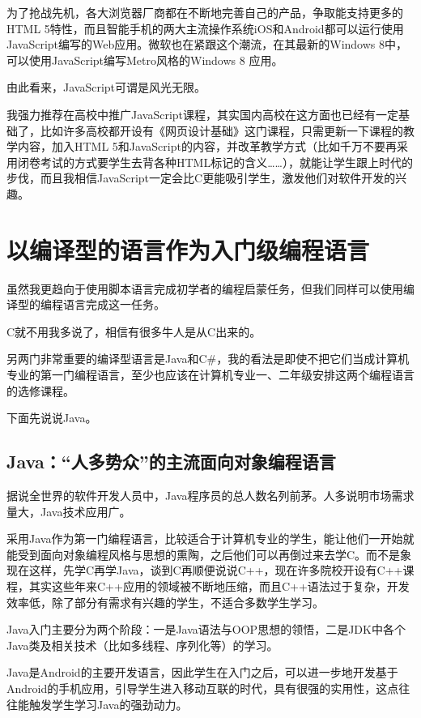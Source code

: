 为了抢战先机，各大浏览器厂商都在不断地完善自己的产品，争取能支持更多的HTML 5特性，而且智能手机的两大主流操作系统iOS和Android都可以运行使用JavaScript编写的Web应用。微软也在紧跟这个潮流，在其最新的Windows 8中，可以使用JavaScript编写Metro风格的Windows 8 应用。

由此看来，JavaScript可谓是风光无限。

我强力推荐在高校中推广JavaScript课程，其实国内高校在这方面也已经有一定基础了，比如许多高校都开设有《网页设计基础》这门课程，只需更新一下课程的教学内容，加入HTML 5和JavaScript的内容，并改革教学方式（比如千万不要再采用闭卷考试的方式要学生去背各种HTML标记的含义……），就能让学生跟上时代的步伐，而且我相信JavaScript一定会比C更能吸引学生，激发他们对软件开发的兴趣。

\section{以编译型的语言作为入门级编程语言}

虽然我更趋向于使用脚本语言完成初学者的编程启蒙任务，但我们同样可以使用编译型的编程语言完成这一任务。

C就不用我多说了，相信有很多牛人是从C出来的。

另两门非常重要的编译型语言是Java和C\#，我的看法是即使不把它们当成计算机专业的第一门编程语言，至少也应该在计算机专业一、二年级安排这两个编程语言的选修课程。

下面先说说Java。



\subsection{Java：“人多势众”的主流面向对象编程语言}

据说全世界的软件开发人员中，Java程序员的总人数名列前茅。人多说明市场需求量大，Java技术应用广。

采用Java作为第一门编程语言，比较适合于计算机专业的学生，能让他们一开始就能受到面向对象编程风格与思想的熏陶，之后他们可以再倒过来去学C。而不是象现在这样，先学C再学Java，谈到C再顺便说说C++，现在许多院校开设有C++课程，其实这些年来C++应用的领域被不断地压缩，而且C++语法过于复杂，开发效率低，除了部分有需求有兴趣的学生，不适合多数学生学习。

Java入门主要分为两个阶段：一是Java语法与OOP思想的领悟，二是JDK中各个Java类及相关技术（比如多线程、序列化等）的学习。

Java是Android的主要开发语言，因此学生在入门之后，可以进一步地开发基于Android的手机应用，引导学生进入移动互联的时代，具有很强的实用性，这点往往能触发学生学习Java的强劲动力。

